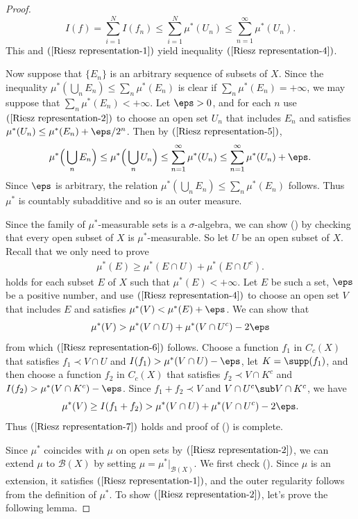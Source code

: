 \begin{proof}
\[I(f)=\sum_{i=1}^{N}I(f_n)\leq\sum_{i=1}^{N}\mu^*(U_n)\leq\sum_{n=1}^{\infty}\mu^*(U_n).\]
This and $(\ref{Riesz representation-1})$ yield inequality $(\ref{Riesz representation-4})$.\par
Now suppose that $\{E_n\}$ is an arbitrary sequence of subsets of $X$. Since the inequality $\mu^*(\bigcup_nE_n)\leq\sum_n\mu^*(E_n)$ is clear if $\sum_n\mu^*(E_n)=+\infty$, we may suppose that $\sum_n\mu^*(E_n)<+\infty$. Let $\eps>0$, and for each $n$ use $(\ref{Riesz representation-2})$ to choose
an open set $U_n$ that includes $E_n$ and satisfies $\mu^*(U_n)\leq\mu^*(E_n)+\eps/2^n$. Then by $(\ref{Riesz representation-5})$,
\[\mu^*\Big(\bigcup_nE_n\Big)\leq\mu^*\Big(\bigcup_nU_n\Big)\leq\sum_{n=1}^{\infty}\mu^*(U_n)\leq\sum_{n=1}^{\infty}\mu^*(U_n)+\eps.\]
Since $\eps$ is arbitrary, the relation $\mu^*(\bigcup_nE_n)\leq\sum_n\mu^*(E_n)$ follows. Thus $\mu^*$ is countably subadditive and so is an outer measure.\par
Since the family of $\mu^*$-measurable sets is a $\sigma$-algebra, we can show () by checking that every open subset of $X$ is $\mu^*$-measurable. So let $U$ be an open subset of $X$. Recall that we only need to prove
\begin{align}\label{Riesz representation-6}
\mu^*(E)\geq\mu^*(E\cap U)+\mu^*(E\cap U^c).
\end{align}
holds for each subset $E$ of $X$ such that $\mu^*(E)<+\infty$. Let $E$ be such a set, $\eps$ be a positive number, and use $(\ref{Riesz representation-4})$ to choose an open set $V$ that includes $E$ and satisfies $\mu^*(V)<\mu^*(E)+\eps$. We can show that
\begin{align}\label{Riesz representation-7}
\mu^*(V)>\mu^*(V\cap U)+\mu^*(V\cap U^c)-2\eps
\end{align}
from which $(\ref{Riesz representation-6})$ follows. Choose a function $f_1$ in $C_c(X)$ that satisfies $f_1\prec V\cap U$ and $I(f_1)>\mu^*(V\cap U)-\eps$, let $K=\supp(f_1)$, and then choose a function $f_2$ in $C_c(X)$ that satisfies $f_2\prec V\cap K^c$ and $I(f_2)>\mu^*(V\cap K^c)-\eps$. Since $f_1+f_2\prec V$ and $V\cap U^c\sub V\cap K^c$, we have
\[\mu^*(V)\geq I(f_1+f_2)>\mu^*(V\cap U)+\mu^*(V\cap U^c)-2\eps.\]
Thus $(\ref{Riesz representation-7})$ holds and proof of () is complete.\par
Since $\mu^*$ coincides with $\mu$ on open sets by $(\ref{Riesz representation-2})$, we can extend $\mu$ to $\mathcal{B}(X)$ by setting $\mu=\mu^*|_{\mathcal{B}(X)}$. We first check (). Since $\mu$ is an extension, it satisfies $(\ref{Riesz representation-1})$, and the outer regularity follows from the definition of $\mu^*$. To show $(\ref{Riesz representation-2})$, let's prove the following lemma.

\end{proof}
